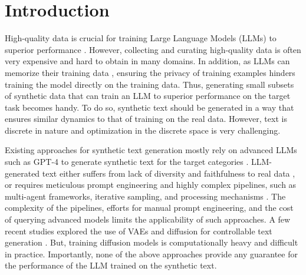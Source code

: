 \section{Introduction}\label{sec:intro}
%
%
%
%
%
High-quality data is crucial for training Large Language Models (LLMs) to superior performance \cite{yang2024smalltolarge,li2023synthetic}. However, collecting and curating high-quality data is often very expensive and hard to obtain in many domains. In addition, as LLMs can memorize their training data \cite{hartmann2023sok}, ensuring the privacy of training examples hinders training the model directly on the training data.
%
Thus, generating small subsets of synthetic data that can train an LLM to superior performance on the target task becomes handy.
%
To do so, synthetic text should be generated in a way that ensures similar dynamics to that of training on the real data.  
%
However, text is discrete in nature and optimization in the discrete space is very challenging.

Existing approaches for synthetic text generation mostly rely on advanced LLMs such as GPT-4 to generate synthetic text for the target categories \cite{ye2022zerogen,meng2022generating,li2023synthetic,gupta2023targen,tao2024textual,wu2024unigen,dekoninckcontrolled,yu2024large}.
%
%
LLM-generated text either suffers from lack of diversity and faithfulness to real data \cite{ye2022zerogen,meng2022generating,li2023synthetic}, or requires %
meticulous prompt engineering and highly complex  pipelines, such as multi-agent frameworks, iterative sampling, and processing mechanisms \cite{gupta2023targen,dekoninckcontrolled,wu2024unigen}. 
The complexity of the pipelines, efforts for manual prompt engineering, and the cost of querying advanced models limits the applicability of such approaches.
%
%
A few recent studies explored the use of VAEs and diffusion for %
controllable text generation \cite{li2022diffusion,gong2022diffuseq,zhou2024difflm}. But, training diffusion models is computationally heavy and difficult in practice.
%
Importantly, none of the above approaches provide any guarantee for the performance of the LLM trained on the synthetic text. %
%
%
%

